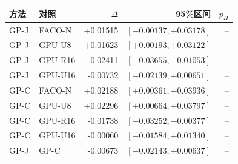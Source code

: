\begin{tabular}{@{}llrrr@{}}
\toprule
方法 & 对照 & $\Delta$ & 95\%区间 & $p_H$ \\ \midrule
GP-J & FACO-N & +0.01515 & $[-0.00137,+0.03178]$ & -- \\
GP-J & GPU-U8 & +0.01623 & $[+0.00193,+0.03122]$ & -- \\
GP-J & GPU-R16 & -0.02411 & $[-0.03655,-0.01053]$ & -- \\
GP-J & GPU-U16 & -0.00732 & $[-0.02139,+0.00651]$ & -- \\
GP-C & FACO-N & +0.02188 & $[+0.00361,+0.03936]$ & -- \\
GP-C & GPU-U8 & +0.02296 & $[+0.00664,+0.03797]$ & -- \\
GP-C & GPU-R16 & -0.01738 & $[-0.03252,-0.00377]$ & -- \\
GP-C & GPU-U16 & -0.00060 & $[-0.01584,+0.01340]$ & -- \\
GP-J & GP-C & -0.00673 & $[-0.02143,+0.00637]$ & -- \\
\bottomrule
\end{tabular}
